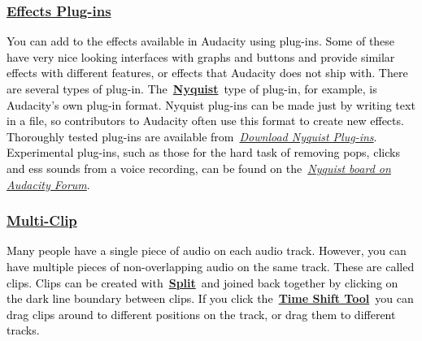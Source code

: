 \documentclass[letterpaper]{article}
\begin{document}
\subsubsection[Effects
Plug{}-ins]{\href{https://manual.audacityteam.org/man/customization.html\#plug-ins}{\textcolor[rgb]{0.3529412,0.21176471,0.5882353}{Effects
Plug-ins}}}
\textcolor{black}{You can add to the effects available in Audacity using plug-ins. Some of these have very nice looking
interfaces with graphs and buttons and provide similar effects with different features, or effects that Audacity does
not ship with. There are several types of plug-in.
The~}\href{https://manual.audacityteam.org/man/customization.html\#plug-ins}{\textbf{\textcolor[rgb]{0.3529412,0.21176471,0.5882353}{Nyquist}}}\textcolor{black}{~type
of plug-in, for example, is Audacity's own plug-in format. Nyquist plug-ins can be made just by writing text in a file,
so contributors to Audacity often use this format to create new effects. Thoroughly tested plug-ins are available
from~}\href{https://wiki.audacityteam.org/wiki/Download_Nyquist_Plug-ins}{\textit{\textcolor[rgb]{0.2,0.4,0.73333335}{Download
Nyquist Plug-ins}}}\textcolor{black}{. Experimental plug-ins, such as those for the hard task of removing pops, clicks
and {\textquotedbl}ess{\textquotedbl} sounds from a voice recording, can be found on
the~}\href{https://forum.audacityteam.org/viewforum.php?f=39}{\textit{\textcolor[rgb]{0.2,0.4,0.73333335}{Nyquist board
on Audacity Forum}}}\textcolor{black}{.}

\subsubsection[Multi{}-Clip]{\href{https://manual.audacityteam.org/man/audacity_tracks_and_clips.html}{\textcolor[rgb]{0.3529412,0.21176471,0.5882353}{Multi-Clip}}}
\textcolor{black}{Many people have a single piece of audio on each audio track. However, you can have multiple pieces of
non-overlapping audio on the same track. These are called clips. Clips can be created
with~}\href{https://manual.audacityteam.org/man/audacity_tracks_and_clips.html#split}{\textbf{\textcolor[rgb]{0.3529412,0.21176471,0.5882353}{Split}}}\textcolor{black}{~and
joined back together by clicking on the dark line boundary between clips. If you click
the~}\href{https://manual.audacityteam.org/man/tools_toolbar.html#timeshift}{\textbf{\textcolor[rgb]{0.3529412,0.21176471,0.5882353}{Time
Shift Tool}}}\textcolor{black}{~you can drag clips around to different positions on the track, or drag them to
different tracks.}
\end{document}
